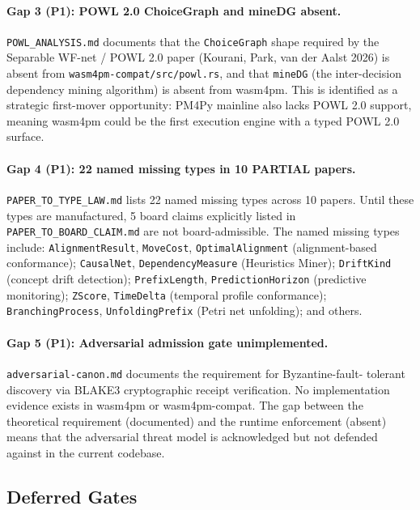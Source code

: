 \paragraph{Gap 3 (P1): POWL 2.0 ChoiceGraph and mineDG absent.}
\texttt{POWL\_ANALYSIS.md} documents that the \texttt{ChoiceGraph} shape
required by the Separable WF-net / POWL 2.0 paper (Kourani, Park, van der
Aalst 2026) is absent from \texttt{wasm4pm-compat/src/powl.rs}, and that
\texttt{mineDG} (the inter-decision dependency mining algorithm) is absent
from wasm4pm. This is identified as a strategic first-mover opportunity:
PM4Py mainline also lacks POWL 2.0 support, meaning wasm4pm could be the
first execution engine with a typed POWL 2.0 surface.

\paragraph{Gap 4 (P1): 22 named missing types in 10 PARTIAL papers.}
\texttt{PAPER\_TO\_TYPE\_LAW.md} lists 22 named missing types across 10 papers.
Until these types are manufactured, 5 board claims explicitly listed in
\texttt{PAPER\_TO\_BOARD\_CLAIM.md} are not board-admissible. The named missing
types include: \texttt{AlignmentResult}, \texttt{MoveCost},
\texttt{OptimalAlignment} (alignment-based conformance); \texttt{CausalNet},
\texttt{DependencyMeasure} (Heuristics Miner); \texttt{DriftKind} (concept
drift detection); \texttt{PrefixLength}, \texttt{PredictionHorizon}
(predictive monitoring); \texttt{ZScore}, \texttt{TimeDelta} (temporal profile
conformance); \texttt{BranchingProcess}, \texttt{UnfoldingPrefix} (Petri net
unfolding); and others.

\paragraph{Gap 5 (P1): Adversarial admission gate unimplemented.}
\texttt{adversarial-canon.md} documents the requirement for Byzantine-fault-
tolerant discovery via BLAKE3 cryptographic receipt verification. No
implementation evidence exists in wasm4pm or wasm4pm-compat. The gap between
the theoretical requirement (documented) and the runtime enforcement
(absent) means that the adversarial threat model is acknowledged but not
defended against in the current codebase.

\subsection{Deferred Gates}
\label{sec:sources-papers-open-deferred}

